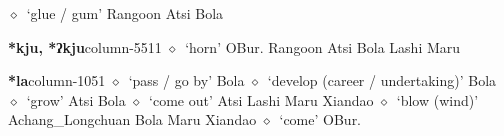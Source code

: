          $\diamond$~`glue / gum'
         Rangoon 
\hspace{1ex}
         Atsi 
\hspace{1ex}
         Bola 
  \item {\footnotesize \textbf{*kju, *ʔkju}}{\tiny column-5511}
         $\diamond$~`horn'
         OBur. 
\hspace{1ex}
         Rangoon 
\hspace{1ex}
         Atsi 
\hspace{1ex}
         Bola 
\hspace{1ex}
         Lashi 
\hspace{1ex}
         Maru 
  \item {\footnotesize \textbf{*la}}{\tiny column-1051}
         $\diamond$~`pass / go by'
         Bola 
\hspace{1ex}
         $\diamond$~`develop (career / undertaking)'
         Bola 
\hspace{1ex}
         $\diamond$~`grow'
         Atsi 
\hspace{1ex}
         Bola 
\hspace{1ex}
         $\diamond$~`come out'
         Atsi 
\hspace{1ex}
         Lashi 
\hspace{1ex}
         Maru 
\hspace{1ex}
         Xiandao 
\hspace{1ex}
         $\diamond$~`blow (wind)'
         Achang\_Longchuan 
\hspace{1ex}
         Bola 
\hspace{1ex}
         Maru 
\hspace{1ex}
         Xiandao 
\hspace{1ex}
         $\diamond$~`come'
         OBur. 
